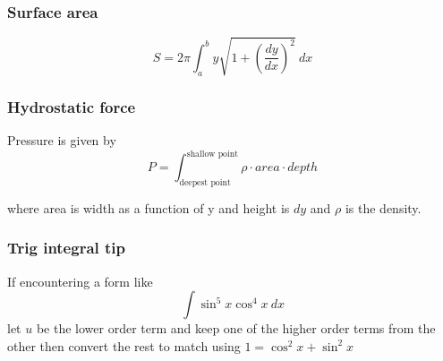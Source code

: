 \documentclass{article}
\begin{document}
\begin{multicols}{2}
\subsubsection*{Surface area}
\[
	S = 2\pi \int_a^b y \sqrt{1+\left( \frac{dy}{dx} \right)^2}\ dx
\]

\subsubsection*{Hydrostatic force}
Pressure is given by
\[
	P = \int_\text{deepest point}^\text{shallow point} \rho \cdot area \cdot depth
\]

where area is width as a function of y and height is $dy$ and $\rho$ is the density.

\subsubsection*{Trig integral tip}
If encountering a form like
\[
	\int \sin^5 x \cos^4 x\ dx
\]
let $u$ be the lower order term and keep one of the higher order terms from the other then convert the rest to match using $1 = \cos^2 x + \sin^2 x$

\end{multicols}

\pagebreak
\end{document}
